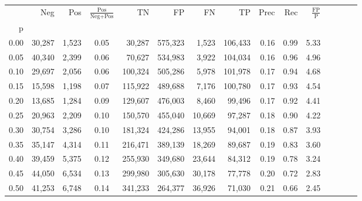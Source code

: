 \begin{tabular}{rrrcrrrrrrrrrrr}
\toprule
{} &     Neg &    Pos & $\frac{\text{Pos}}{\text{Neg}+\text{Pos}}$ &       TN &       FP &       FN &       TP &  Prec &   Rec & $\frac{\text{FP}}{\text{P}}$ \\
p    &         &        &                                            &          &          &          &          &       &       &                              \\
\midrule
0.00 &  30,287 &  1,523 &                                       0.05 &   30,287 &  575,323 &    1,523 &  106,433 &  0.16 &  0.99 &                         5.33 \\
0.05 &  40,340 &  2,399 &                                       0.06 &   70,627 &  534,983 &    3,922 &  104,034 &  0.16 &  0.96 &                         4.96 \\
0.10 &  29,697 &  2,056 &                                       0.06 &  100,324 &  505,286 &    5,978 &  101,978 &  0.17 &  0.94 &                         4.68 \\
0.15 &  15,598 &  1,198 &                                       0.07 &  115,922 &  489,688 &    7,176 &  100,780 &  0.17 &  0.93 &                         4.54 \\
0.20 &  13,685 &  1,284 &                                       0.09 &  129,607 &  476,003 &    8,460 &   99,496 &  0.17 &  0.92 &                         4.41 \\
0.25 &  20,963 &  2,209 &                                       0.10 &  150,570 &  455,040 &   10,669 &   97,287 &  0.18 &  0.90 &                         4.22 \\
0.30 &  30,754 &  3,286 &                                       0.10 &  181,324 &  424,286 &   13,955 &   94,001 &  0.18 &  0.87 &                         3.93 \\
0.35 &  35,147 &  4,314 &                                       0.11 &  216,471 &  389,139 &   18,269 &   89,687 &  0.19 &  0.83 &                         3.60 \\
0.40 &  39,459 &  5,375 &                                       0.12 &  255,930 &  349,680 &   23,644 &   84,312 &  0.19 &  0.78 &                         3.24 \\
0.45 &  44,050 &  6,534 &                                       0.13 &  299,980 &  305,630 &   30,178 &   77,778 &  0.20 &  0.72 &                         2.83 \\
0.50 &  41,253 &  6,748 &                                       0.14 &  341,233 &  264,377 &   36,926 &   71,030 &  0.21 &  0.66 &                         2.45 \\

\end{tabular}
